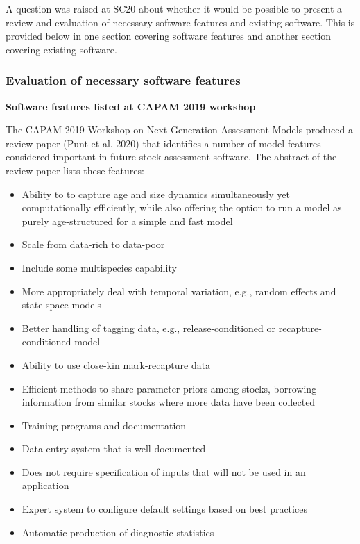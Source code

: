 \documentclass{SCreport}
\begin{document}
\vspace{2ex}

A question was raised at SC20 about whether it would be possible to present a
review and evaluation of necessary software features and existing software. This
is provided below in one section covering software features and another section
covering existing software.

\subsubsection{Evaluation of necessary software features}

\vspace{1ex}

\textbf{Software features listed at CAPAM 2019 workshop}

\vspace{1ex}

The CAPAM 2019 Workshop on Next Generation Assessment Models produced a review
paper (Punt et al. 2020) that identifies a number of model features considered
important in future stock assessment software. The abstract of the review paper
lists these features:

\begin{itemize}
  \item Ability to to capture age and size dynamics simultaneously yet
  computationally efficiently, while also offering the option to run a model as
  purely age-structured for a simple and fast model
  \item Scale from data-rich to data-poor
  \item Include some multispecies capability
  \item More appropriately deal with temporal variation, e.g., random effects
  and state-space models
  \item Better handling of tagging data, e.g., release-conditioned or
  recapture-conditioned model
  \item Ability to use close-kin mark-recapture data
  \item Efficient methods to share parameter priors among stocks, borrowing
  information from similar stocks where more data have been collected
  \item Training programs and documentation
  \item Data entry system that is well documented
  \item Does not require specification of inputs that will not be used in an
  application
  \item Expert system to configure default settings based on best practices
  \item Automatic production of diagnostic statistics
\end{itemize}
\end{document}
